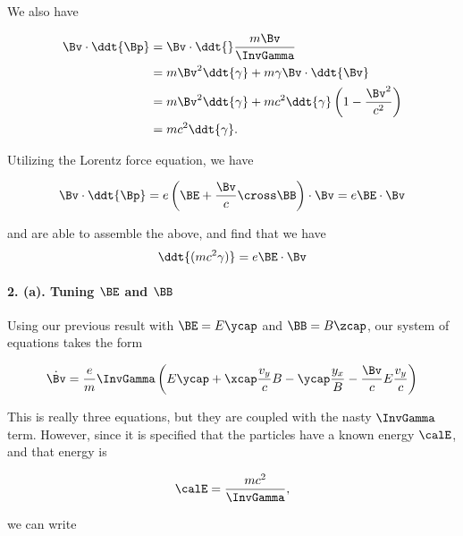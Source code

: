 {We also have

\begin{equation}\label{eqn:relElectroDynProblemSet2:1170}
\begin{aligned}
\Bv \cdot \ddt{\Bp} 
&= \Bv \cdot \ddt{} \frac{m \Bv}{\InvGamma} \\
&= m\Bv^2 \ddt{\gamma} + m \gamma \Bv \cdot \ddt{\Bv} \\
&= m\Bv^2 \ddt{\gamma} + m c^2 \ddt{\gamma} \left( 1 - \frac{\Bv^2}{c^2} \right) \\
&= m c^2 \ddt{\gamma}.
\end{aligned}
\end{equation}

Utilizing the Lorentz force equation, we have

\begin{equation}\label{eqn:relElectroDynProblemSet2:250}
\Bv \cdot \ddt{\Bp} = e \left( \BE + \frac{\Bv}{c} \cross \BB \right) \cdot \Bv = e \BE \cdot \Bv
\end{equation}

and are able to assemble the above, and find that we have
\begin{equation}\label{eqn:relElectroDynProblemSet2:270}
\ddt{(m c^2 \gamma)} = e \BE \cdot \Bv
\end{equation}

\paragraph{2. (a). Tuning \texorpdfstring{\(\BE\) and \(\BB\)}{E and B}}

Using our previous result with \(\BE = E \ycap\) and \(\BB = B \zcap\), our system of equations takes the form

\begin{equation}\label{eqn:relElectroDynProblemSet2:290}
\dot{\Bv} = \frac{e}{m} \InvGamma \left( E \ycap + \xcap \frac{v_y}{c} B - \ycap \frac{y_x} B - \frac{\Bv}{c} E \frac{v_y}{c} \right)
\end{equation}

This is really three equations, but they are coupled with the nasty \(\InvGamma\) term.  However, since it is specified that the particles have a known energy \(\calE\), and that energy is

\begin{equation}\label{eqn:relElectroDynProblemSet2:310}
\calE = \frac{ m c^2 }{\InvGamma},
\end{equation}

we can write

}
